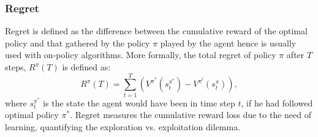 \subsubsection{Regret}
Regret is defined as the difference between the cumulative reward of the optimal policy and that gathered by the policy $\pi$ played by the agent hence is usually used with on-policy algorithms. More formally, the total regret of policy $\pi$ after $T$ steps, $R^{\pi}(T)$ is defined as:
\begin{equation}
	R^{\pi}(T)=\sum_{t=1}^{T}\left(V^{\pi^*}(s_t^{\pi^*})-V^{\pi^t}(s_t^{\pi})\right),
\end{equation}
where $s_t^{\pi^*}$ is the state the agent would have been in time step $t$, if he had followed optimal policy $\pi^*$. Regret measures the cumulative reward loss due to the need of learning, quantifying the exploration vs. exploitation dilemma. 
